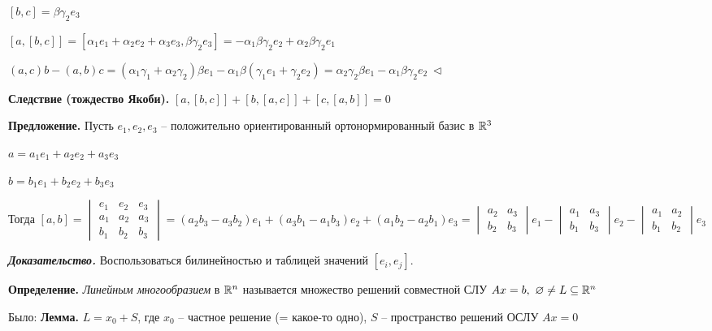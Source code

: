 $[b, c] = \beta \gamma_2 e_3$

$[a, [b, c]] = [\alpha_1 e_1 + \alpha_2 e_2 + \alpha_3 e_3, \beta \gamma_2 e_3] = -\alpha_1 \beta \gamma_2 e_2 + \alpha_2 \beta \gamma_2 e_1$

$(a, c) b - (a, b) c = (\alpha_1 \gamma_1 + \alpha_2 \gamma_2) \beta e_1 - \alpha_1 \beta (\gamma_1 e_1 + \gamma_2 e_2) = \alpha_2 \gamma_2 \beta e_1 - \alpha_1 \beta \gamma_2 e_2 \ \lhd$

\vspace{\baselineskip}
\textbf{Следствие (тождество Якоби).} $[a, [b, c]] + [b, [a, c]] + [c, [a, b]] = 0$

\vspace{\baselineskip}
\textbf{Предложение.} Пусть $e_1, e_2, e_3$ -- положительно ориентированный ортонормированный базис в $\mathbb{R}^3$

$a = a_1 e_1 + a_2 e_2 + a_3 e_3$

$b = b_1 e_1 + b_2 e_2 + b_3 e_3$

Тогда $[a, b] = \begin{vmatrix} e_1 & e_2 & e_3 \\ a_1 & a_2 & a_3 \\ b_1 & b_2 & b_3 \end{vmatrix} = (a_2 b_3 - a_3 b_2) e_1 + (a_3 b_1 - a_1 b_3) e_2 + (a_1 b_2 - a_2 b_1) e_3 = \begin{vmatrix} a_2 & a_3 \\ b_2 & b_3 \end{vmatrix} e_1 - \begin{vmatrix} a_1 & a_3 \\ b_1 & b_3 \end{vmatrix} e_2 - \begin{vmatrix} a_1 & a_2 \\ b_1 & b_2 \end{vmatrix} e_3 $

\vspace{\baselineskip}
\textbf{\textit{Доказательство.}} Воспользоваться билинейностью и таблицей значений $[e_i, e_j]$.

\vspace{\baselineskip}
\textbf{Определение.} \textit{Линейным многообразием} в $\mathbb{R}^n$ называется множество решений совместной СЛУ $Ax = b, \ \varnothing \neq L \subseteq \mathbb{R}^n$

\vspace{\baselineskip}
Было:
\textbf{Лемма.} $L = x_0 + S$, где $x_0$ -- частное решение (= какое-то одно), $S$ -- пространство решений ОСЛУ $Ax = 0$

